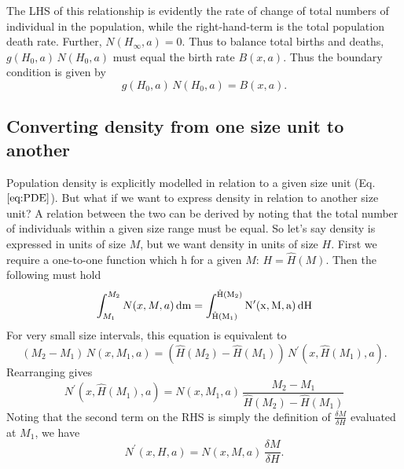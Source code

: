 \documentclass[10pt,twoside]{article}
\begin{document}
The LHS of this relationship is evidently the rate of change of total
numbers of individual in the population, while the right-hand-term is
the total population death rate. Further, \(N(H_{\infty}, a) = 0\). Thus
to balance total births and deaths, \(g(H_{0} , a) \, N(H_{0} , a)\) must
equal the birth rate \(B(x, a)\). Thus the boundary condition is given
by
\begin{equation} g(H_{0} , a) \, N(H_{0} , a) = B(x, a).
\end{equation}

\subsection{Converting density from one size unit to
another}\label{converting-density-from-one-size-unit-to-another}

Population density is explicitly modelled in relation to a given size
unit (Eq. \(\ref{eq:PDE}\)). But what if we want to express density in
relation to another size unit? A relation between the two can be derived
by noting that the total number of individuals within a given size range
must be equal. So let's say density is expressed in units of size \(M\),
but we want density in units of size \(H\). First we require a
one-to-one function which h for a given \(M\): \(H = \hat{H}(M)\). Then
the following must hold
\begin{equation} \label{eq:n_conversion} \int_{M_1}^{M_2} N(x, M, a) \, \rm{d}m = \int_{\hat{H}(M_1)}^{\hat{H}(M_2)} N^\prime(x, M, a) \, {\rm d}H
\end{equation}
For very small size intervals, this equation is equivalent to
\begin{equation} \left(M_2 - M_1 \right) \, N(x, M_1, a) = \left( \hat{H}(M_2) - \hat{H}(M_1)\right) \, N^\prime(x, \hat{H}(M_1), a).
\end{equation}
Rearranging gives
\begin{equation}  N^\prime(x, \hat{H}(M_1), a) = N(x, M_1, a) \, \frac{M_2 - M_1}{\hat{H}(M_2) - \hat{H}(M_1)}
\end{equation}
Noting that the second term on the RHS is simply the definition of
\(\frac{\delta M}{\delta H}\) evaluated at \(M_1\), we have
\begin{equation} \label{eq:n_conversion2} N^\prime(x, H, a) = N(x, M, a) \, \frac{\delta M}{\delta H}.
\end{equation}

\clearpage

\end{document}
